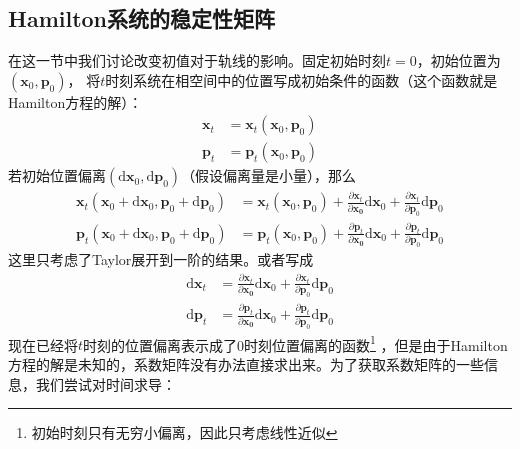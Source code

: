     \subsection{Hamilton系统的稳定性矩阵}
    在这一节中我们讨论改变初值对于轨线的影响。固定初始时刻$t=0$，初始位置为$(\bm{x}_0, \bm{p}_0)$，
    将$t$时刻系统在相空间中的位置写成初始条件的函数（这个函数就是Hamilton方程的解）：
    \begin{equation}
        \begin{split}
            \bm{x}_t &= \bm{x}_t(\bm{x}_0, \bm{p}_0)\\
            \bm{p}_t &= \bm{p}_t(\bm{x}_0, \bm{p}_0)
        \end{split}
    \end{equation}
    若初始位置偏离$(\mathrm{d}\bm{x}_0,\mathrm{d}\bm{p}_0)$（假设偏离量是小量），那么
    \begin{equation}
        \begin{split}
        \bm{x}_t(\bm{x}_0+\mathrm{d}\bm{x}_0, \bm{p}_0+\mathrm{d}\bm{p}_0) &= \bm{x}_t(\bm{x}_0, \bm{p}_0) + \frac {\partial \bm{x}_t}{\partial \bm{x_0}} \mathrm{d} \bm{x}_0 + \frac {\partial \bm{x}_t}{\partial \bm{p}_0} \mathrm{d} \bm{p}_0\\
        \bm{p}_t(\bm{x}_0+\mathrm{d}\bm{x}_0, \bm{p}_0+\mathrm{d}\bm{p}_0) &= \bm{p}_t(\bm{x}_0, \bm{p}_0) + \frac {\partial \bm{p}_t}{\partial \bm{x_0}} \mathrm{d} \bm{x}_0 + \frac {\partial \bm{p}_t}{\partial \bm{p}_0} \mathrm{d} \bm{p}_0
        \end{split}
    \end{equation}
    这里只考虑了Taylor展开到一阶的结果。或者写成
    \begin{equation}
        \begin{split}
            \mathrm{d}\bm{x}_t &= \frac {\partial \bm{x}_t}{\partial \bm{x_0}} \mathrm{d} \bm{x}_0 + \frac {\partial \bm{x}_t}{\partial \bm{p}_0} \mathrm{d} \bm{p}_0\\
            \mathrm{d}\bm{p}_t &= \frac {\partial \bm{p}_t}{\partial \bm{x_0}} \mathrm{d} \bm{x}_0 + \frac {\partial \bm{p}_t}{\partial \bm{p}_0} \mathrm{d} \bm{p}_0
        \end{split}
        \end{equation}
    现在已经将$t$时刻的位置偏离表示成了0时刻位置偏离的函数\footnote{初始时刻只有无穷小偏离，因此只考虑线性近似}
    ，但是由于Hamilton方程的解是未知的，系数矩阵没有办法直接求出来。为了获取系数矩阵的一些信息，我们尝试对时间求导：
